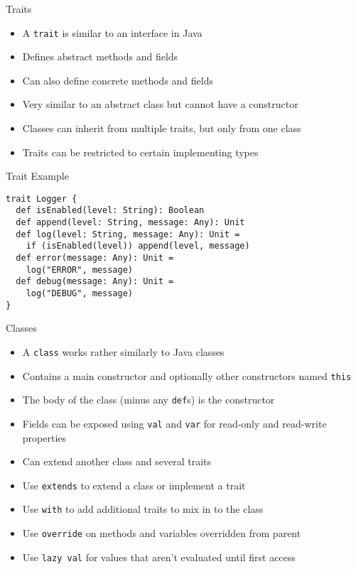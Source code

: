 \documentclass{beamer}
\begin{document}
\begin{frame}{Traits}
\begin{itemize}
\item A \lstinline{trait} is similar to an interface in Java
\item Defines abstract methods and fields
\item Can also define concrete methods and fields
\item Very similar to an abstract class but cannot have a constructor
\item Classes can inherit from multiple traits, but only from one class
\item Traits can be restricted to certain implementing types
\end{itemize}
\end{frame}

\begin{frame}[fragile]{Trait Example}
\begin{lstlisting}
trait Logger {
  def isEnabled(level: String): Boolean
  def append(level: String, message: Any): Unit
  def log(level: String, message: Any): Unit =
    if (isEnabled(level)) append(level, message)
  def error(message: Any): Unit =
    log("ERROR", message)
  def debug(message: Any): Unit =
    log("DEBUG", message)
}
\end{lstlisting}
\end{frame}

\begin{frame}{Classes}
\begin{itemize}
\item A \lstinline{class} works rather similarly to Java classes
\item Contains a main constructor and optionally other constructors named \lstinline{this}
\item The body of the class (minus any \lstinline{def}s) is the constructor
\item Fields can be exposed using \lstinline{val} and \lstinline{var} for read-only
and read-write properties
\item Can extend another class and several traits
\item Use \lstinline{extends} to extend a class or implement a trait
\item Use \lstinline{with} to add additional traits to mix in to the class
\item Use \lstinline{override} on methods and variables overridden from parent
\item Use \lstinline{lazy val} for values that aren't evaluated until first access
\end{itemize}
\end{frame}
\end{document}
